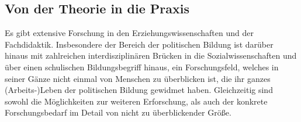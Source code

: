

\subsection{Von der Theorie in die Praxis \label{theorie in praxis}}
Es gibt extensive Forschung in den Erziehungswissenschaften und der Fachdidaktik. Insbesondere der Bereich der politischen Bildung ist darüber hinaus mit zahlreichen interdisziplinären Brücken in die Sozialwissenschaften und über einen schulischen Bildungsbegriff hinaus, ein Forschungsfeld, welches in seiner Gänze nicht einmal von Menschen zu überblicken ist, die ihr ganzes (Arbeits-)Leben der politischen Bildung gewidmet haben. 
Gleichzeitig sind sowohl die Möglichkeiten zur weiteren Erforschung, als auch der konkrete Forschungsbedarf im Detail von nicht zu überblickender Größe. 

